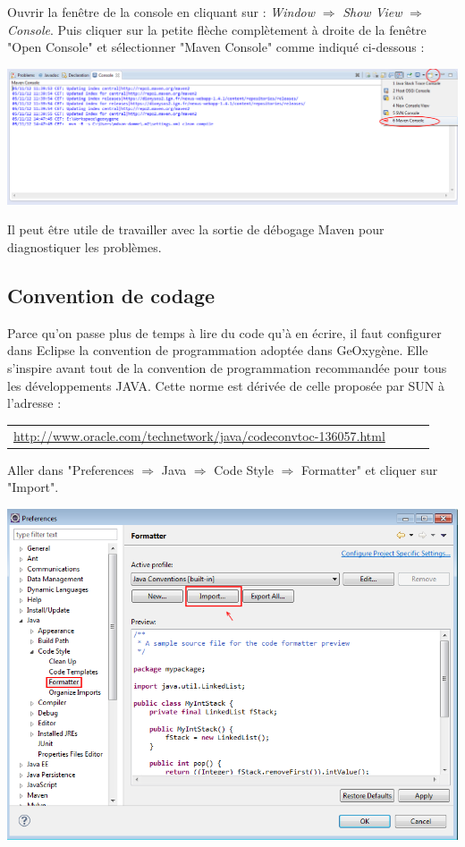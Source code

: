 Ouvrir la fenêtre de la console en cliquant sur : {\emph{Window} $\Rightarrow$ \emph{Show View}  $\Rightarrow$ \emph{Console}}. Puis cliquer sur la petite flèche complètement à droite de la fenêtre "Open Console" et sélectionner "Maven Console" comme indiqué ci-dessous :

\begin{center}
\includegraphics[width=0.5\linewidth]{../../resources/images/guide_installation/geoxygeneEtape5.png}
\end{center}

Il peut être utile de travailler avec la sortie de débogage Maven pour diagnostiquer les problèmes.




\subsection{Convention de codage}

Parce qu'on passe plus de temps à lire du code qu’à en écrire, il faut configurer dans Eclipse la convention de programmation adoptée dans GeOxygène. Elle s'inspire avant tout de la convention de programmation recommandée pour tous les développements JAVA. Cette norme est dérivée de celle proposée par SUN à l’adresse :

\begin{tabular}[!t]{llll}
{\href{http://www.oracle.com/technetwork/java/codeconvtoc-136057.html}{http://www.oracle.com/technetwork/java/codeconvtoc-136057.html}}  
\end{tabular}

\noindent
Aller dans "Preferences $\Rightarrow$ Java $\Rightarrow$ Code Style $\Rightarrow$ Formatter" et cliquer sur "Import". 

\begin{center}
\includegraphics[width=0.5\linewidth]{../../resources/images/guide_installation/ConfigEclipseConventionCodage_1.png}
\end{center}

